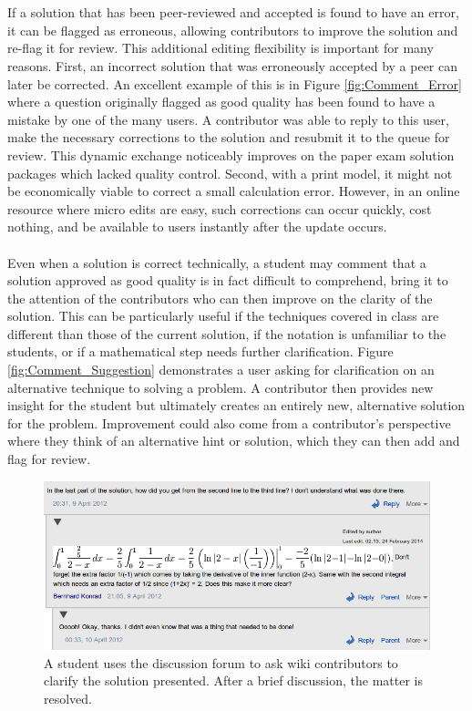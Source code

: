 \documentclass{primus}
\begin{document}
\\\\
\noindent{}If a solution that has been peer-reviewed and accepted is found to have an error, it can be flagged as erroneous, allowing contributors to improve the solution and re-flag it for review. This additional editing flexibility is important for many reasons. First, an incorrect solution that was erroneously accepted by a peer can later be corrected. An excellent example of this is in Figure \ref{fig:Comment_Error} where a question originally flagged as good quality has been found to have a mistake by one of the many users. A contributor was able to reply to this user, make the necessary corrections to the solution and resubmit it to the queue for review. This dynamic exchange noticeably improves on the paper exam solution packages which lacked quality control. Second, with a print model, it might not be economically viable to
correct a small calculation error. However, in an online resource where micro edits are easy, such corrections can occur quickly, cost nothing, and be available to users instantly after the update occurs.
\\\\
\noindent{}Even when a solution is correct technically, a student may comment that a solution approved as good quality is in fact difficult to comprehend, bring it to the attention of the contributors who can then improve on the clarity of the solution. This can be particularly useful if the techniques covered in class are different than those of the current solution, if the notation is unfamiliar to the students, or if a mathematical step needs further clarification. Figure \ref{fig:Comment_Suggestion} demonstrates a user asking for clarification on an alternative technique to solving a problem. A contributor then provides new insight for the student but ultimately creates an entirely new, alternative solution for the problem. Improvement could also come from a contributor's perspective where they think of an alternative hint or solution, which they can then add and flag for review.
\begin{figure}[H]
\centering
\includegraphics[width=\textwidth]{figs/Comment_Question.png}
\caption{A student uses the discussion forum to ask wiki contributors to clarify the solution presented. After a brief discussion, the matter is resolved.}\label{fig:Comment_Question}
\end{figure}
\end{document}
